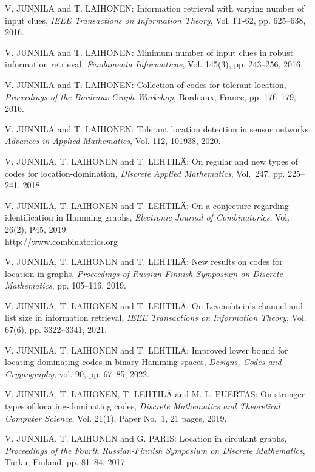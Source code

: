 \begin{thebibliography}{999}
V. JUNNILA and T. LAIHONEN: Information retrieval with varying number of input clues, {\it IEEE Transactions on Information Theory}, Vol. IT-62, pp. 625--638, 2016.  

V. JUNNILA and T. LAIHONEN: Minimum number of input clues in robust information retrieval, {\it Fundamenta Informaticae}, Vol. 145(3), pp. 243--256, 2016.

V. JUNNILA and T. LAIHONEN: Collection of codes for tolerant location, {\it Proceedings of the Bordeaux Graph Workshop}, Bordeaux, France, pp. 176--179, 2016.

V. JUNNILA and T. LAIHONEN: Tolerant location detection in sensor networks, {\it Advances in Applied Mathematics}, Vol. 112, 101938, 2020.

V. JUNNILA, T. LAIHONEN and T. LEHTIL\"A: On regular and new types of codes for location-domination, {\it Discrete Applied Mathematics}, Vol.~247, pp. 225--241, 2018.

V. JUNNILA, T. LAIHONEN and T. LEHTIL\"A: On a conjecture regarding identification in Hamming graphs, {\it Electronic Journal of Combinatorics}, Vol. 26(2), P45, 2019.\\
http://www.combinatorics.org

V. JUNNILA, T. LAIHONEN and T. LEHTIL\"A: New results on codes for location in graphs, {\it Proceedings of Russian Finnish Symposium on Discrete Mathematics}, pp. 105--116, 2019.

V. JUNNILA, T. LAIHONEN and T. LEHTIL\"A: On Levenshtein's channel and list size in information retrieval, {\it IEEE Transactions on Information Theory}, Vol. 67(6), pp. 3322--3341, 2021.

V. JUNNILA, T. LAIHONEN and T. LEHTIL\"A: Improved lower bound for locating-dominating codes in binary Hamming spaces, {\it Designs, Codes and Cryptography}, vol. 90, pp. 67--85, 2022.

V. JUNNILA, T. LAIHONEN, T. LEHTIL\"A and M. L. PUERTAS: On stronger types of locating-dominating codes, {\it Discrete Mathematics and Theoretical Computer Science}, Vol. 21(1), Paper No.~1, 21 pages, 2019.

V. JUNNILA, T. LAIHONEN and G. PARIS: Location in circulant graphs, {\it Proceedings of the Fourth Russian-Finnish Symposium on Discrete Mathematics}, Turku, Finland, pp. 81--84, 2017.


\end{thebibliography}
